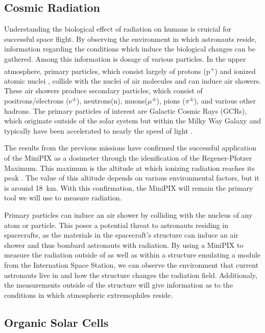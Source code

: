 \subsection{Cosmic Radiation}
\label{subsec:RadiationBackground}

Understanding the biological effect of radiation on humans is cruicial for successful space flight.
By observing the environment in which astronauts reside, information regarding the conditions which induce the biological changes can be gathered.
Among this information is dosage of various particles.
In the upper atmosphere, primary particles, which consist largely of protons (p\textsuperscript{+}) and ionized atomic nuclei \cite{Frank}, collide with the nuclei of air molecules and can induce air showers.
These air showers produce secondary particles, which consist of positrons/electrons (e\textsuperscript{$\pm$}), neutrons(n), muons($\mu$\textsuperscript{$\pm$}), pions ($\pi$\textsuperscript{$\pm$}), and various other hadrons.
The primary particles of interest are Galactic Cosmic Rays (GCRs), which originate outside of the solar system but within the Milky Way Galaxy and typically have been accelerated to nearly the speed of light \cite{GCRs}.

The results from the previous missions have confirmed the successful application of the MiniPIX as a dosimeter through the idenification of the Regener-Pfotzer Maximum. This maximum is the altitude at which ionizing radiation reaches its peak \cite{Regener}. The value of this altitude depends on various environmental factors, but it is around \SI{18}{\kilo\meter}. With this confirmation, the MiniPIX will remain the primary tool we will use to measure radiation.

Primary particles can induce an air shower by colliding with the nucleus of any atom or particle.
This poses a potential threat to astronauts residing in spacecrafts, as the materials in the spacecraft's structure can induce an air shower and thus bombard astronauts with radiation.
By using a MiniPIX to measure the radiation outside of as well as within a structure emulating a module from the Internation Space Station, we can observe the environment that current astronauts live in and how the structure changes the radiation field.
Additionaly, the measurements outside of the structure will give information as to the conditions in which atmospheric extremophiles reside.

\subsection{Organic Solar Cells}
